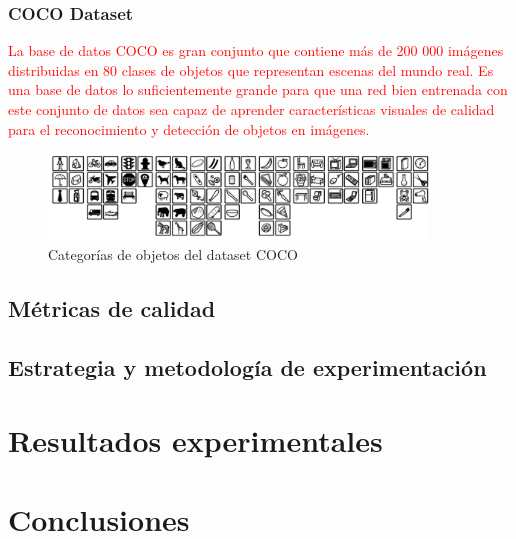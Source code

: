 \subsubsection{COCO Dataset}

\textcolor{red}{La base de datos COCO es gran conjunto que contiene más de 200 000 imágenes distribuidas en 80 clases de objetos que representan escenas del mundo real. Es una base de datos lo suficientemente grande para que una red bien entrenada con este conjunto de datos sea capaz de aprender características visuales de calidad para el reconocimiento y detección de objetos en imágenes.}

\begin{figure}[ht]
\centering
\includegraphics[width=0.9\textwidth]{img/chapters/resultados/bases-datos/cocodataset.png}
\caption{\label{fig:cocodataset}Categorías de objetos del dataset COCO}
\end{figure}

\subsection{Métricas de calidad}
\label{subsec:metricas-calidad}

\subsection{Estrategia y metodología de experimentación}
\label{subsec:estrategia-metodologia}

\section{Resultados experimentales}
\label{sec:resultados-experimentales}

\section{Conclusiones}
\label{sec:conclu-resultados}